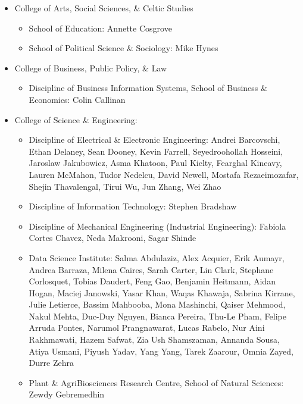 \documentclass[10pt,a4paper]{res} %
\begin{document}
\begin{resume}
\begin{itemize} \itemsep -2pt
\item College of Arts, Social Sciences, \& Celtic Studies
\begin{itemize}
\item School of Education: Annette Cosgrove
\item School of Political Science \& Sociology: Mike Hynes
\end{itemize}
\item College of Business, Public Policy, \& Law
\begin{itemize}
\item Discipline of Business Information Systems, School of Business \& Economics: Colin Callinan
\end{itemize}
\item College of Science \& Engineering:
\begin{itemize}
\item Discipline of Electrical \& Electronic Engineering: Andrei Barcovschi, Ethan Delaney, Sean Dooney, Kevin Farrell, Seyedroohollah Hosseini, Jaroslaw Jakubowicz, Asma Khatoon, Paul Kielty, Fearghal Kineavy, Lauren McMahon, Tudor Nedelcu, David Newell, Mostafa Rezaeimozafar, Shejin Thavalengal, Tirui Wu, Jun Zhang, Wei Zhao
\item Discipline of Information Technology: Stephen Bradshaw
\item Discipline of Mechanical Engineering (Industrial Engineering): Fabiola Cortes Chavez, Neda Makrooni, Sagar Shinde
\item Data Science Institute: Salma Abdulaziz, Alex Acquier, Erik Aumayr, Andrea Barraza, Milena Caires, Sarah Carter, Lin Clark, Stephane Corlosquet, Tobias Daudert, Feng Gao, Benjamin Heitmann, Aidan Hogan, Maciej Janowski, Yasar Khan, Waqas Khawaja, Sabrina Kirrane, Julie Letierce, Bassim Mahbooba, Mona Mashinchi, Qaiser Mehmood, Nakul Mehta, Duc-Duy Nguyen, Bianca Pereira, Thu-Le Pham, Felipe Arruda Pontes, Narumol Prangnawarat, Lucas Rabelo, Nur Aini Rakhmawati, Hazem Safwat, Zia Ush Shamszaman, Annanda Sousa, Atiya Usmani, Piyush Yadav, Yang Yang, Tarek Zaarour, Omnia Zayed, Durre Zehra
\item Plant \& AgriBiosciences Research Centre, School of Natural Sciences: Zewdy Gebremedhin
\end{itemize}
\end{itemize}



\end{resume}
\end{document}
